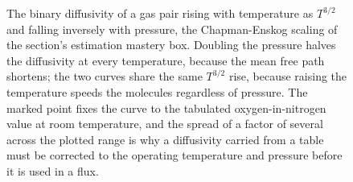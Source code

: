 \begin{figure}[htbp]
\centering
{}
\caption[Gas diffusivity rising as $T^{3/2}$ and falling with
pressure]{The binary diffusivity of a gas pair rising with temperature as
$T^{3/2}$ and falling inversely with pressure, the Chapman-Enskog scaling of
the section's estimation mastery box. Doubling the pressure halves the
diffusivity at every temperature, because the mean free path shortens; the
two curves share the same $T^{3/2}$ rise, because raising the temperature
speeds the molecules regardless of pressure. The marked point fixes the
curve to the tabulated oxygen-in-nitrogen value at room temperature, and the
spread of a factor of several across the plotted range is why a diffusivity
carried from a table must be corrected to the operating temperature and
pressure before it is used in a flux.}
\label{fig:vol04ch07:diffusivity-temperature}
\end{figure}
